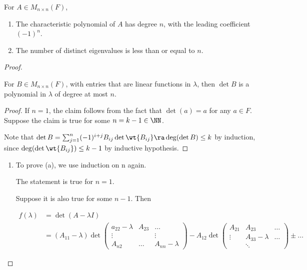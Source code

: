 \documentclass[11pt]{scrartcl}
\begin{document}
\begin{theorem}
  For \(A\in M_{n\times n}(F)\),

  \begin{enumerate}[label=\alph*)]
  \item The characteristic polynomial of \(A\) has degree \(n\), with the leading coefficient \((-1)^{n}\).
  \item The number of distinct eigenvalues is less than or equal to
    \(n\).
  \end{enumerate}
\end{theorem}
\begin{proof}
  \begin{claim*}
    For \(B\in M_{n\times n}(F)\), with entries that are linear
    functions in \(\lambda\), then \(\det B\) is a polynomial in
    \(\lambda\) of degree at most \(n\).
  \end{claim*}
\begin{proof}
  If \(n=1\), the claim follows from the fact that \(\det (a) = a \)
  for any \(a \in F\).
  Suppose the claim is true for some \(n = k-1\in \NN\).

  Note that
  \(\det B = \sum_{j=1}^{n} (-1)^{i+j} B_{ij}\det \wt{B_{ij}}\ra
  \deg(\det B) \leq k\) by induction, since \(\deg(\det \wt{B_{ij}}) \leq k-1\) by inductive hypothesis.
\end{proof}
\begin{enumerate}[label=\alph*)]
\item

To prove (a), we use induction on n again.

The statement is true for \(n = 1\).

Suppose it is also true for some \(n-1\). Then


\begin{align*}
  f(\lambda) &= \det(A-\lambda I)\\
             &= (A_{11}-\lambda)\det \begin{pmatrix}
    a_{22} - \lambda & A_{23} & \dots\\
    \vdots & & \vdots\\
    A_{n2} & \dots & A_{nn} - \lambda
  \end{pmatrix} - A_{12} \det \begin{pmatrix}
    A_{21} & A_{23} & \dots\\
    \vdots & A_{33} - \lambda & \dots\\
    & \ddots &
  \end{pmatrix} \pm \dots
\end{align*}


\end{enumerate}
\end{proof}
\end{document}
